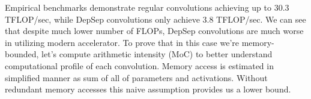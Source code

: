 
% 

% 

Empirical benchmarks demonstrate regular convolutions achieving up to 30.3 TFLOP/sec, while DepSep convolutions only achieve 3.8 TFLOP/sec. We can see that despite much lower number of FLOPs, DepSep convolutions are much worse in utilizing modern accelerator. To prove that in this case we're memory-bounded, let's compute arithmetic intensity (MoC) to better understand computational profile of each convolution. Memory access is estimated in simplified manner as sum of all of parameters and activations. Without redundant memory accesses this naive assumption provides us a lower bound.


